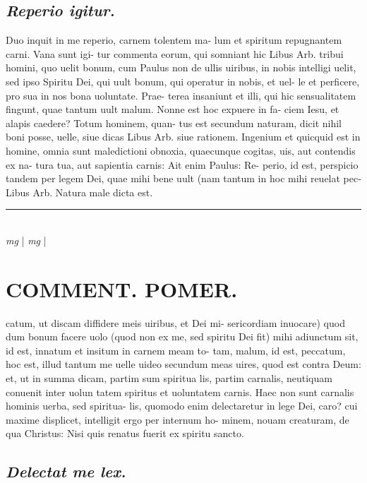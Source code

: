 \documentclass{article}
\begin{document}
\begin{pages}
\subsection*{\textit{Reperio igitur. }}\pstart Duo inquit in me reperio, carnem tolentem ma- lum et spiritum repugnantem carni. Vana sunt igi- tur commenta eorum, qui somniant hic Libus Arb.  tribui homini, quo uelit bonum, cum Paulus non de ullis uiribus, in nobis intelligi uelit, sed ipso Spiritu Dei, qui uult bonum, qui operatur in nobis, et uel- le et perficere, pro sua in nos bona uoluntate. Prae- terea insaniunt et illi, qui hic sensualitatem fingunt, quae tantum uult malum. Nonne est hoc expuere in fa- ciem Iesu, et alapis caedere? Totum hominem, quan- tus est secundum naturam, dicit nihil boni posse, uelle, siue dicas Libus Arb. siue rationem. Ingenium et quicquid est in homine, omnia sunt maledictioni obnoxia, quaecunque cogitas, uis, aut contendis ex na- tura tua, aut sapientia carnis: Ait enim Paulus: Re- perio, id est, perspicio tandem per legem Dei, quae mihi bene uult (nam tantum in hoc mihi reuelat pec- Libus Arb.  Natura male dicta est.   \pend
\vspace{0.5cm}\noindent
\vspace{0.2cm}\rule{1cm}{0.2pt}\\ 
\hspace{0.2cm}\textit{mg}
\footnotesize 
\normalsize| 
\hspace{0.2cm}\textit{mg}
\footnotesize 
\normalsize| 
\section*{COMMENT. POMER.  }\pstart catum, ut discam diffidere meis uiribus, et Dei mi- sericordiam inuocare) quod dum bonum facere uolo (quod non ex me, sed spiritu Dei fit) mihi adiunctum sit, id est, innatum et insitum in carnem meam to- tam, malum, id est, peccatum, hoc est, illud tantum me uelle uideo secundum meas uires, quod est contra Deum: et, ut in summa dicam, partim sum spiritua lis, partim carnalis, neutiquam conuenit inter uolun tatem spiritus et uoluntatem carnis.  \pend\pstart Haec non sunt carnalis hominis uerba, sed spiritua- lis, quomodo enim delectaretur in lege Dei, caro? cui maxime displicet, intelligit ergo per internum ho- minem, nouam creaturam, de qua Christus: Nisi quis renatus fuerit ex spiritu sancto.   \pend
{}
{}
\subsection*{\textit{Delectat me lex. }}
{}

\end{pages}
\end{document}
